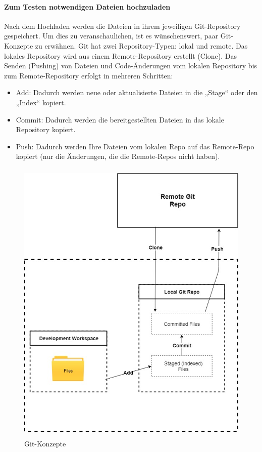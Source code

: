 \documentclass[a4paper,12pt,oneside]{book}
\begin{document}
\paragraph{Zum Testen notwendigen Dateien hochzuladen}
Nach dem Hochladen werden die Dateien in ihrem jeweiligen Git-Repository gespeichert. Um dies zu veranschaulichen, ist es wünschenswert, paar Git-Konzepte zu erwähnen.
\newline
Git hat zwei Repository-Typen: lokal und remote. Das lokales Repository wird aus einem Remote-Repository erstellt (Clone). Das Senden (Pushing) von Dateien und Code-Änderungen vom lokalen Repository bis zum Remote-Repository erfolgt in mehreren Schritten: 
\begin{itemize}
	\item Add: Dadurch werden neue oder aktualisierte Dateien in die „Stage“ oder den „Index“ kopiert.
	\item Commit: Dadurch werden die bereitgestellten Dateien in das lokale Repository kopiert.
	\item Push: Dadurch werden Ihre Dateien vom lokalen Repo auf das Remote-Repo kopiert (nur die Änderungen, die die Remote-Repos nicht haben).
\end{itemize}
\begin{figure}[h!]
	\begin{center}
		\includegraphics[width=14cm, height=14cm]{Git-Konzept.jpg}
		\caption{Git-Konzepte} 
		\label{ Git-Konzepte} 
	\end{center}
\end{figure}
\end{document}
